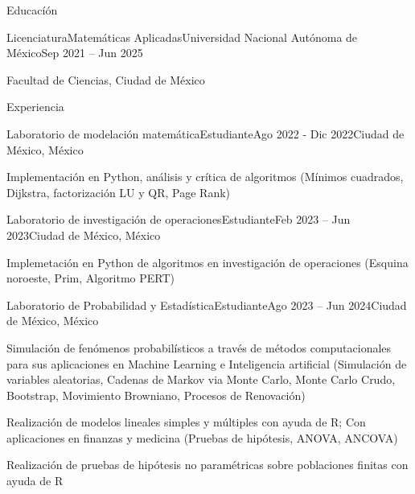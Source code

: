\documentclass[]{kyvernitis-resume}
\begin{document}
\resumeheader
{}
{}
{}




\begin{section}{Educacíón}
    \begin{subsectionnobullet}{Licenciatura}{Matemáticas Aplicadas}{Universidad Nacional Autónoma de México}{Sep 2021 -- Jun 2025}
    \item Facultad de Ciencias, Ciudad de México
    \end{subsectionnobullet}
\end{section}

\begin{section}{Experiencia}
    \begin{subsection}{Laboratorio de modelación matemática}{Estudiante}{Ago 2022 - Dic 2022}{Ciudad de México, México}
        \item Implementación en Python, análisis y crítica de algoritmos (Mínimos cuadrados, Dijkstra, factorización LU y QR, Page Rank)
    \end{subsection}
    
    \begin{subsection}{Laboratorio de investigación de operaciones}{Estudiante}{Feb 2023 -- Jun 2023}{Ciudad de México, México}
        \item Implemetación en Python de algoritmos en investigación de operaciones (Esquina noroeste, Prim, Algoritmo PERT)
    \end{subsection}
	
	\begin{subsection}{Laboratorio de Probabilidad y Estadística}{Estudiante}{Ago 2023 -- Jun 2024}{Ciudad de México, México}
		\item Simulación de fenómenos probabilísticos a través de métodos computacionales para sus aplicaciones en Machine Learning e Inteligencia artificial (Simulación de variables aleatorias, Cadenas de Markov via Monte Carlo, Monte Carlo Crudo, Bootstrap, Movimiento Browniano, Procesos de Renovación)
		
		\item Realización de modelos lineales simples y múltiples con ayuda de R; Con aplicaciones en finanzas y medicina (Pruebas de hipótesis, ANOVA, ANCOVA)
		
		\item Realización de pruebas de hipótesis no paramétricas sobre poblaciones finitas con ayuda de R 
	\end{subsection}
    
    
\end{section}
\end{document}
